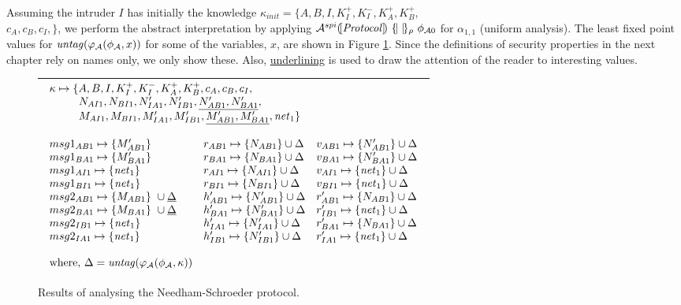 \documentclass[10pt,a4paper,final,oneside,fleqn]{book}
\begin{document}
Assuming the intruder $I$ has initially the knowledge $\kappa_{init}=\{A,B,I,K^+_I,K^-_I,K^+_A,K^+_B,$\\$c_A,c_B,c_I,\}$, we perform the abstract interpretation by applying $\mathcal{A}^{spi}(\![\mbox{{\itshape Protocol\/}}]\!)~\{\!|~|\!\}_\rho~\phi_{\mathcal{A}0}$ for $\alpha_{1,1}$ (uniform analysis). The least fixed point values for $\mbox{{\itshape untag\/}}(\varphi_\mathcal{A}(\phi_\mathcal{A},x))$ for some of the variables, $x$, are shown in Figure \ref{anneed}.  Since the definitions of security properties in the next chapter rely on names only, we only show these. Also, \underline{underlining} is used to draw the attention of the reader to interesting values.
\begin{figure}[bht]
\begin{center}
\begin{tabular}{|l|}
\hline
$\begin{array}{lll}
\multicolumn{3}{l}{\kappa\mapsto\{A,B,I,K^+_I,K^-_I,K^+_A,K^+_B,c_A,c_B,c_I,}\\
\multicolumn{3}{l}{~~~~~~~~N_{AI1},N_{BI1},N'_{IA1},N'_{IB1},\underline{N'_{AB1},N'_{BA1}},}\\
\multicolumn{3}{l}{~~~~~~~~M_{AI1},M_{BI1},M'_{IA1},M'_{IB1},\underline{M'_{AB1},M'_{BA1}},\mbox{{\itshape net\/}}_1\}}\\\\
msg1_{AB1}\mapsto\{M'_{AB1}\}&r_{AB1}\mapsto\{N_{AB1}\}\cup\Delta&v_{AB1}\mapsto\{N'_{AB1}\}\cup\Delta\\
msg1_{BA1}\mapsto\{M'_{BA1}\}&r_{BA1}\mapsto\{N_{BA1}\}\cup\Delta&v_{BA1}\mapsto\{N'_{BA1}\}\cup\Delta\\
msg1_{AI1}\mapsto\{\mbox{{\itshape net\/}}_1\}&r_{AI1}\mapsto\{N_{AI1}\}\cup\Delta&v_{AI1}\mapsto\{\mbox{{\itshape net\/}}_1\}\cup\Delta\\
msg1_{BI1}\mapsto\{\mbox{{\itshape net\/}}_1\}&r_{BI1}\mapsto\{N_{BI1}\}\cup\Delta&v_{BI1}\mapsto\{\mbox{{\itshape net\/}}_1\}\cup\Delta\\
msg2_{AB1}\mapsto\{M_{AB1}\}~\cup\underline{\Delta}&h'_{AB1}\mapsto\{N'_{AB1}\}\cup\Delta&r'_{AB1}\mapsto\{N_{AB1}\}\cup\Delta\\
msg2_{BA1}\mapsto\{M_{BA1}\}~\cup\underline{\Delta}&h'_{BA1}\mapsto\{N'_{BA1}\}\cup\Delta&r'_{IB1}\mapsto\{\mbox{{\itshape net\/}}_1\}\cup\Delta\\
msg2_{IB1}\mapsto\{\mbox{{\itshape net\/}}_1\}&h'_{IA1}\mapsto\{N'_{IA1}\}\cup\Delta&r'_{BA1}\mapsto\{N_{BA1}\}\cup\Delta\\
msg2_{IA1}\mapsto\{\mbox{{\itshape net\/}}_1\}&h'_{IB1}\mapsto\{N'_{IB1}\}\cup\Delta&r'_{IA1}\mapsto\{\mbox{{\itshape net\/}}_1\}\cup\Delta\\&&\\
\mbox{where, }\Delta=\mbox{{\itshape untag\/}}(\varphi_\mathcal{A}(\phi_\mathcal{A},\kappa))&&\\
\end{array}$\\
\hline
\end{tabular}
\end{center}
\caption{Results of analysing the Needham-Schroeder protocol.\label{anneed}}
\end{figure}
\end{document}
